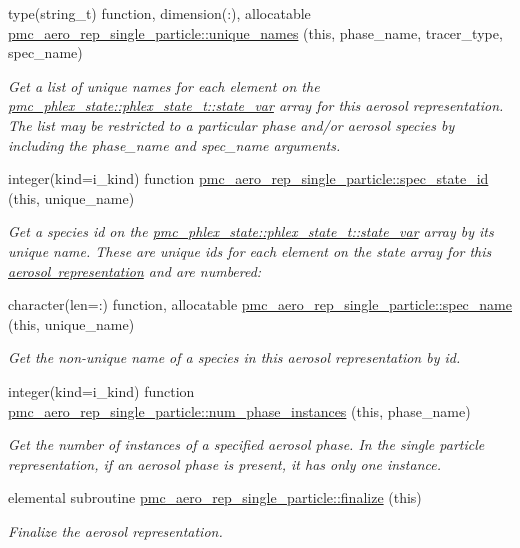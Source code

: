 \begin{DoxyCompactItemize}
type(string\+\_\+t) function, dimension(\+:), allocatable \mbox{\hyperlink{namespacepmc__aero__rep__single__particle_a1098b3373c2ff364ed4ff94ae7c92e87}{pmc\+\_\+aero\+\_\+rep\+\_\+single\+\_\+particle\+::unique\+\_\+names}} (this, phase\+\_\+name, tracer\+\_\+type, spec\+\_\+name)
\begin{DoxyCompactList}\small\item\em Get a list of unique names for each element on the {\ttfamily \mbox{\hyperlink{structpmc__phlex__state_1_1phlex__state__t_a78835cb552d483ebbfc7a6bc6f756918}{pmc\+\_\+phlex\+\_\+state\+::phlex\+\_\+state\+\_\+t\+::state\+\_\+var}}} array for this aerosol representation. The list may be restricted to a particular phase and/or aerosol species by including the phase\+\_\+name and spec\+\_\+name arguments. \end{DoxyCompactList}\item 
integer(kind=i\+\_\+kind) function \mbox{\hyperlink{namespacepmc__aero__rep__single__particle_a7621cb78dd3cc167e9e4ff7ab3be7333}{pmc\+\_\+aero\+\_\+rep\+\_\+single\+\_\+particle\+::spec\+\_\+state\+\_\+id}} (this, unique\+\_\+name)
\begin{DoxyCompactList}\small\item\em Get a species id on the {\ttfamily \mbox{\hyperlink{structpmc__phlex__state_1_1phlex__state__t_a78835cb552d483ebbfc7a6bc6f756918}{pmc\+\_\+phlex\+\_\+state\+::phlex\+\_\+state\+\_\+t\+::state\+\_\+var}}} array by its unique name. These are unique ids for each element on the state array for this \mbox{\hyperlink{phlex_aero_rep}{aerosol representation}} and are numbered\+: \end{DoxyCompactList}\item 
character(len=\+:) function, allocatable \mbox{\hyperlink{namespacepmc__aero__rep__single__particle_aca095bc0566cf66509faf0681db0ecf1}{pmc\+\_\+aero\+\_\+rep\+\_\+single\+\_\+particle\+::spec\+\_\+name}} (this, unique\+\_\+name)
\begin{DoxyCompactList}\small\item\em Get the non-\/unique name of a species in this aerosol representation by id. \end{DoxyCompactList}\item 
integer(kind=i\+\_\+kind) function \mbox{\hyperlink{namespacepmc__aero__rep__single__particle_abc4795895a678ddfb6bd453ec35e92ae}{pmc\+\_\+aero\+\_\+rep\+\_\+single\+\_\+particle\+::num\+\_\+phase\+\_\+instances}} (this, phase\+\_\+name)
\begin{DoxyCompactList}\small\item\em Get the number of instances of a specified aerosol phase. In the single particle representation, if an aerosol phase is present, it has only one instance. \end{DoxyCompactList}\item 
elemental subroutine \mbox{\hyperlink{namespacepmc__aero__rep__single__particle_aa3414449aefecf962c845663fbd25826}{pmc\+\_\+aero\+\_\+rep\+\_\+single\+\_\+particle\+::finalize}} (this)
\begin{DoxyCompactList}\small\item\em Finalize the aerosol representation. \end{DoxyCompactList}\end{DoxyCompactItemize}

